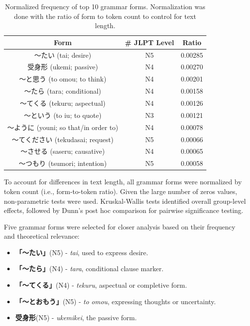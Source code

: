 \begin{table}[h!]
\centering
\begin{tabular}{ccc}
\hline \textbf{Form} & \textbf{\# JLPT Level} & \textbf{Ratio} \\ \hline
〜たい (tai; desire)                      & N5 & 0.00285 \\
受身形 (ukemi; passive)                  & N4 & 0.00270 \\
〜と思う (to omou; to think)             & N4 & 0.00201 \\
〜たら (tara; conditional)               & N4 & 0.00158 \\
〜てくる (tekuru; aspectual)             & N4 & 0.00126 \\
〜という (to iu; to quote)               & N3 & 0.00121 \\
〜ように (youni; so that/in order to)    & N4 & 0.00078 \\
〜てください (tekudasai; request)        & N5 & 0.00066 \\
〜させる (saseru; causative)             & N4 & 0.00065 \\
〜つもり (tsumori; intention)            & N5 & 0.00058 \\
\hline
\end{tabular}
\caption[Top 10 Grammar forms by normalized token ratio extracted from the I-JAS Corpus]{Normalized frequency of top
10 grammar forms. Normalization was done with the ratio of form to token count to control for text length. }
\label{tab:CF-form-freq-ratio}
\end{table}


To account for differences in text length, all grammar forms were normalized by token count (i.e., form-to-token
ratio). Given the large number of zeros values, non-parametric tests were used. Kruskal-Wallis
tests identified overall group-level effects, followed by Dunn's post hoc comparison for pairwise significance testing.


Five grammar forms were selected for closer analysis based on their frequency and theoretical relevance:

\begin{itemize}
\item \textbf{「〜たい」}(N5) - \textit{tai}, used to express desire.
\item \textbf{「〜たら」}(N4) - \textit{tara}, conditional clause marker.
\item \textbf{「〜てくる」}(N4) - \textit{tekuru}, aspectual or completive form.
\item \textbf{「〜とおもう」}(N5) - \textit{to omou}, expressing thoughts or uncertainty.
\item \textbf{受身形}(N5) - \textit{ukemikei}, the passive form.
\end{itemize}

